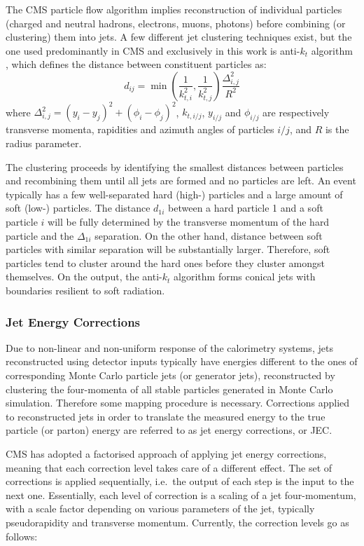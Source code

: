 The CMS particle flow algorithm implies reconstruction of individual particles (charged and neutral hadrons, electrons,
muons, photons) before combining (or clustering) them into jets. A few different jet clustering techniques exist, but
the one used predominantly in CMS and exclusively in this work is anti-$k_t$ algorithm \cite{anti-kt}, which defines the
distance between constituent particles as:
\begin{equation}
d_{ij} = \min\left(\frac{1}{k^2_{t,i}},\frac{1}{k^2_{t,j}}\right) \frac{\Delta_{i,j}^2}{R^2}
\end{equation}
where $\Delta_{i,j}^2 = (y_i-y_j)^2 + (\phi_i-\phi_j)^2$, $k_{t,i/j}$, $y_{i/j}$ and $\phi_{i/j}$ are respectively
transverse momenta, rapidities and azimuth angles of particles $i/j$, and $R$ is the radius parameter.

The clustering proceeds by identifying the smallest distances between particles and recombining them until all jets are
formed and no particles are left. An event typically has a few well-separated hard (high-\pt) particles and a large
amount of soft (low-\pt) particles. The distance $d_{1i}$ between a hard particle 1 and a soft particle $i$ will be
fully determined by the transverse momentum of the hard particle and the $\Delta_{1i}$ separation. On the other hand,
distance between soft particles with similar separation will be substantially larger. Therefore, soft particles tend to
cluster around the hard ones before they cluster amongst themselves. On the output, the anti-$k_t$ algorithm forms
conical jets with boundaries resilient to soft radiation.

\subsubsection{Jet Energy Corrections}
\label{sss:JEC}

Due to non-linear and non-uniform response of the calorimetry systems, jets reconstructed using detector inputs
typically have energies different to the ones of corresponding Monte Carlo particle jets (or generator jets),
reconstructed by clustering the four-momenta of all stable particles generated in Monte Carlo simulation. Therefore some
mapping procedure is necessary. Corrections applied to  reconstructed jets in order to translate the measured energy to
the true particle (or parton) energy are referred to as jet energy corrections, or JEC.

CMS has adopted a factorised approach of applying jet energy corrections, meaning that each correction level takes care
of a different effect. The set of corrections is applied sequentially, i.e.\ the output of each step is the input to the
next one. Essentially, each level of correction is a scaling of a jet four-momentum, with a scale factor depending on
various parameters of the jet, typically pseudorapidity and transverse momentum. Currently, the correction levels go as
follows:


